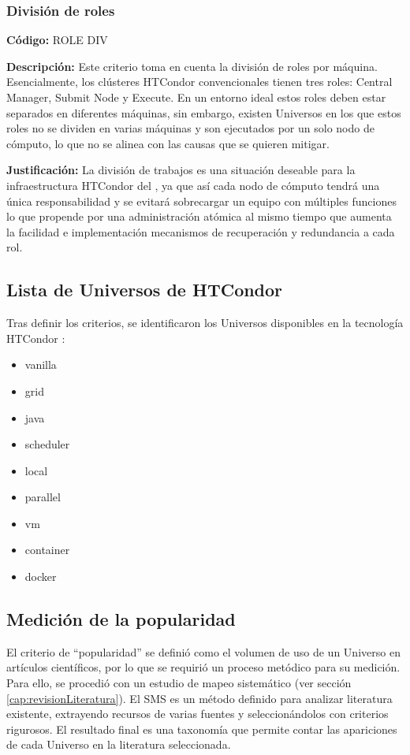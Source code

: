 \subsubsection{División de roles}
\textbf{Código:} ROLE DIV

\textbf{Descripción:} Este criterio toma en cuenta la división de roles por máquina.
Esencialmente, los clústeres HTCondor convencionales tienen tres roles: Central
Manager, Submit Node y Execute. En un entorno ideal estos roles deben estar
separados en diferentes máquinas, sin embargo, existen Universos en los que
estos roles no se dividen en varias máquinas y son ejecutados por un solo nodo
de cómputo, lo que no se alinea con las causas que se quieren mitigar.

\textbf{Justificación:} La división de trabajos es una situación deseable para la
infraestructura HTCondor del \GRID, ya que así cada nodo de cómputo tendrá una
única responsabilidad y se evitará sobrecargar un equipo con múltiples funciones
lo que propende por una administración atómica al mismo tiempo que aumenta la
facilidad e implementación mecanismos de recuperación y redundancia a cada
rol.



\subsection{Lista de Universos de HTCondor}
Tras definir los criterios, se identificaron los Universos disponibles en la tecnología HTCondor \citep{HTCondor-choosing-universe}:
\begin{itemize}
	\item vanilla
	\item grid
	\item java
	\item scheduler
	\item local
	\item parallel
	\item vm
	\item container
	\item docker
\end{itemize}

\subsection{Medición de la popularidad}
El criterio de ``popularidad'' se definió como el volumen de uso de un Universo en artículos científicos, por lo que se requirió un proceso metódico para su medición. Para ello, se procedió con un estudio de mapeo sistemático \SMS (ver sección \ref{cap:revisionLiteratura}). El SMS es un método definido para analizar literatura existente, extrayendo recursos de varias fuentes y seleccionándolos con criterios rigurosos. El resultado final es una taxonomía que permite contar las apariciones de cada Universo en la literatura seleccionada.

